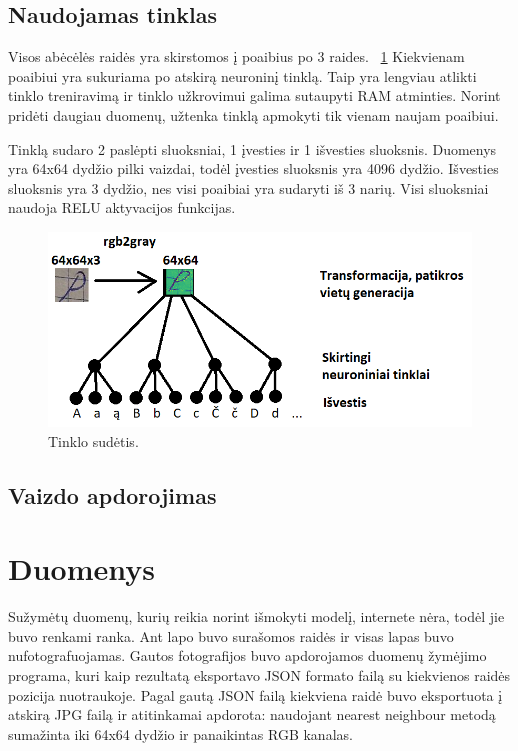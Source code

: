 \documentclass[conference]{IEEEtran}
\begin{document}
\subsection{Naudojamas tinklas}

Visos abėcėlės raidės yra skirstomos į poaibius po 3 raides. ~\ref{fig1} Kiekvienam poaibiui yra
sukuriama po atskirą neuroninį tinklą. Taip yra lengviau atlikti tinklo treniravimą
ir tinklo užkrovimui galima sutaupyti RAM atminties. Norint pridėti daugiau
duomenų, užtenka tinklą apmokyti tik vienam naujam poaibiui.
\par
Tinklą sudaro 2 paslėpti sluoksniai, 1 įvesties ir 1 išvesties sluoksnis. Duomenys
yra 64x64 dydžio pilki vaizdai, todėl įvesties sluoksnis yra 4096 dydžio. Išvesties
sluoksnis yra 3 dydžio, nes visi poaibiai yra sudaryti iš 3 narių. Visi sluoksniai naudoja
RELU aktyvacijos funkcijas.

\begin{figure}[!h] %
\centerline{\includegraphics[scale=0.4] {images/1.png}}
\caption{Tinklo sudėtis.}
\label{fig1}
\end{figure}

\subsection{Vaizdo apdorojimas}

\section{Duomenys}

Sužymėtų duomenų, kurių reikia norint išmokyti modelį, internete nėra, todėl
jie buvo renkami ranka. Ant lapo buvo surašomos raidės ir visas lapas buvo
nufotografuojamas. Gautos fotografijos buvo apdorojamos duomenų žymėjimo programa,
kuri kaip rezultatą eksportavo JSON formato failą su kiekvienos raidės pozicija
nuotraukoje. Pagal gautą JSON failą kiekviena raidė buvo eksportuota į atskirą JPG
failą ir atitinkamai apdorota: naudojant nearest neighbour metodą sumažinta iki
64x64 dydžio ir panaikintas RGB kanalas.
\end{document}
